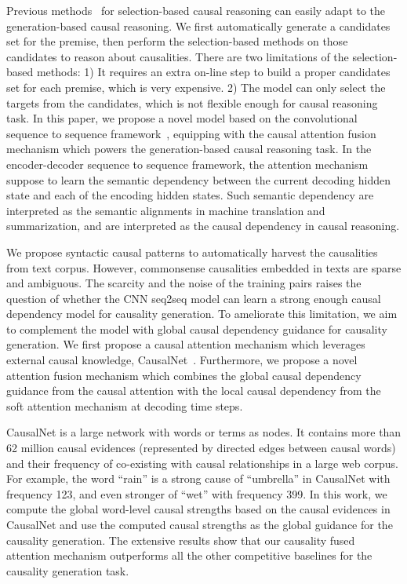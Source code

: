 Previous methods~\cite{roemmele2011choice,goodwin2012utdhlt,
	jabeen2014using, LuoSZHW16} 
for selection-based causal reasoning can easily adapt to the generation-based causal reasoning.
We first automatically generate a candidates set for the premise, then perform the selection-based methods on those candidates to reason about causalities.
There are two limitations of the selection-based methods: 1) It requires an extra on-line step to build a proper candidates set for each premise, which is very expensive. 2) The model can only select the targets from the candidates, which is not flexible enough for causal reasoning task.
In this paper, we propose a novel model based on the convolutional sequence to sequence framework~\cite{gehring2017convs2s}, equipping with the causal attention fusion mechanism which powers the generation-based causal reasoning task.
In the encoder-decoder sequence to sequence framework, the attention mechanism suppose to learn the semantic dependency between the current decoding hidden state and each of the encoding hidden states. 
Such semantic dependency are interpreted as
the semantic alignments in machine translation and summarization, 
and are interpreted as the causal dependency in causal reasoning.

We propose syntactic causal patterns to automatically harvest the causalities from text corpus. 
However, commonsense causalities embedded in texts are sparse and ambiguous. 
The scarcity and the noise of the training pairs raises the question of whether the CNN seq2seq model can learn a strong enough causal dependency model for causality generation.
To ameliorate this limitation, 
we aim to complement the model with global causal dependency guidance for causality generation. 
We first propose a causal attention mechanism which leverages external causal knowledge, CausalNet~\cite{LuoSZHW16}.
Furthermore, we propose a novel attention fusion mechanism which combines the global causal dependency guidance from the causal attention with the local causal dependency from the soft attention mechanism at decoding time steps.

 CausalNet is a large network with words or terms as nodes. It contains more than 62 million causal evidences (represented by directed edges between causal words) and their frequency of co-existing with causal relationships in a large web corpus. For example, the word ``rain'' is a strong cause of ``umbrella'' in CausalNet with frequency 123, and even stronger of ``wet'' with frequency 399. 
 In this work, we compute the global word-level causal strengths based on the causal evidences in CausalNet and use the computed causal strengths as the global guidance for the causality generation.
The extensive results show that our causality fused attention mechanism outperforms all the other competitive baselines for the causality generation task.

